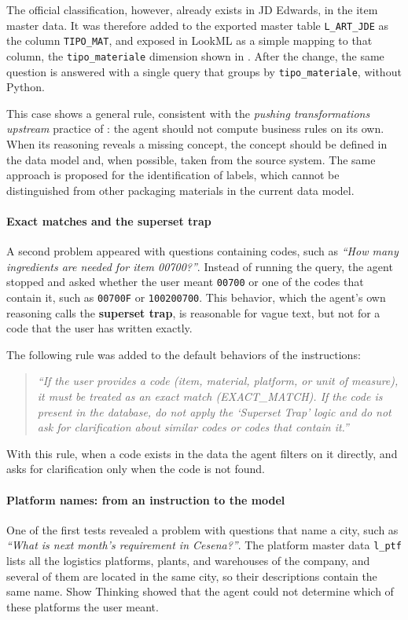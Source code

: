 The official classification, however, already exists in JD Edwards, in the item master data. It was therefore added to the exported master table \texttt{L\_ART\_JDE} as the column \texttt{TIPO\_MAT}, and exposed in LookML as a simple mapping to that column, the \texttt{tipo\_materiale} dimension shown in . After the change, the same question is answered with a single query that groups by \texttt{tipo\_materiale}, without Python.

This case shows a general rule, consistent with the \textit{pushing transformations upstream} practice of : the agent should not compute business rules on its own. When its reasoning reveals a missing concept, the concept should be defined in the data model and, when possible, taken from the source system. The same approach is proposed for the identification of labels, which cannot be distinguished from other packaging materials in the current data model.

\paragraph{Exact matches and the superset trap}
A second problem appeared with questions containing codes, such as \textit{``How many ingredients are needed for item 00700?''}. Instead of running the query, the agent stopped and asked whether the user meant \texttt{00700} or one of the codes that contain it, such as \texttt{00700F} or \texttt{100200700}. This behavior, which the agent's own reasoning calls the \textbf{superset trap}, is reasonable for vague text, but not for a code that the user has written exactly.

The following rule was added to the default behaviors of the instructions:
\begin{quote}
\small\textit{``If the user provides a code (item, material, platform, or unit of measure), it must be treated as an exact match (EXACT\_MATCH). If the code is present in the database, do not apply the `Superset Trap' logic and do not ask for clarification about similar codes or codes that contain it.''}
\end{quote}
With this rule, when a code exists in the data the agent filters on it directly, and asks for clarification only when the code is not found.

\paragraph{Platform names: from an instruction to the model}
One of the first tests revealed a problem with questions that name a city, such as \textit{``What is next month's requirement in Cesena?''}. The platform master data \texttt{l\_ptf} lists all the logistics platforms, plants, and warehouses of the company, and several of them are located in the same city, so their descriptions contain the same name. Show Thinking showed that the agent could not determine which of these platforms the user meant.

